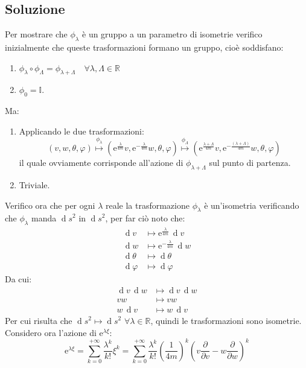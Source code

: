 \documentclass[]{scrartcl}
\newcommand{\me}{\mathrm{e}}
\newcommand{\pfrac}[1]{\frac{\partial}{\partial #1}}
\renewcommand{\d}[1]{\ensuremath{\operatorname{d}\!{#1}}}
\begin{document}
\subsection*{Soluzione}
Per mostrare che $ \phi_\lambda $ è un gruppo a un parametro di isometrie verifico inizialmente che queste trasformazioni formano un
gruppo, cioè soddisfano:
\begin{enumerate}
\item $ \phi_\lambda \circ \phi_\Lambda = \phi_{\lambda + \Lambda} \quad \forall \lambda,\Lambda \in \mathbb{R}$
\item $ \phi_0  = \mathbb{I} $.
\end{enumerate}
Ma:
\begin{enumerate}
\item Applicando le due trasformazioni:
\[
  (v,w,\theta,\varphi) \overset{\phi_\lambda}{\mapsto} \left( \me^\frac{\lambda}{4m} v, \me^{-\frac{\lambda}{4m}} w, \theta, \varphi  \right)
  \overset{\phi_\Lambda}{\mapsto} \left( \me^\frac{\lambda + \Lambda}{4m} v, \me^{-\frac{(\lambda + \Lambda)}{4m}} w, \theta, \varphi  \right)
\]
il quale ovviamente corrisponde all'azione di $ \phi_{\lambda + \Lambda} $ sul punto di partenza.
\item Triviale.
\end{enumerate}
Verifico ora che per ogni $ \lambda $ reale la trasformazione $ \phi_\lambda $ è un'isometria verificando che $ \phi_\lambda $ manda $ \d s^2 $ in
$ \d s^2 $, per far ciò noto che:
\begin{align*}
  \d v  & \mapsto \me^\frac{\lambda}{4m}\, \d v  \\
  \d w & \mapsto \me^{-\frac{\lambda}{4m}}\, \d w \\
  \d \theta & \mapsto \d \theta \\
  \d \varphi & \mapsto \d \varphi
\end{align*}
Da cui:
\begin{align*}
  \d v \,\d w & \mapsto \d v \,\d w \\
  vw & \mapsto vw \\
  w\,\d v  & \mapsto w\,\d v
\end{align*}
Per cui risulta che $ \d s^2 \mapsto \d s^2 \, \, \forall \lambda \in \mathbb{R} $, quindi le trasformazioni sono isometrie.
Considero ora l'azione di $ \me^{\lambda \xi} $: %
\[
  \me^{\lambda \xi} = \sum_{k = 0}^{+\infty} \frac{\lambda^k}{k!}\xi^k = \sum_{k = 0}^{+\infty} \frac{\lambda^k}{k!} \left(\frac{1}{4 m} \right)^k
  \left( v \pfrac{v} - w \pfrac{w} \right)^k
\]
\end{document}
